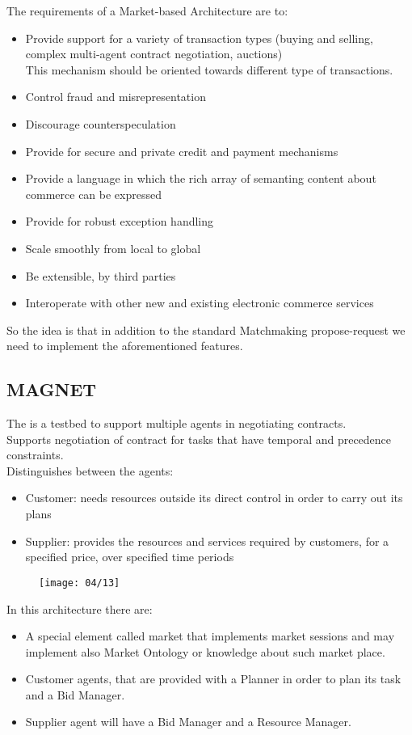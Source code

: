 The requirements of a Market-based Architecture are to:
\begin{itemize}
\item Provide support for a variety of transaction types (buying and selling, complex multi-agent contract negotiation, auctions)\\
This mechanism should be oriented towards different type of transactions.
\item Control fraud and misrepresentation
\item Discourage counterspeculation
\item Provide for secure and private credit and payment mechanisms
\item Provide a language in which the rich array of semanting content about commerce can be expressed
\item Provide for robust exception handling
\item Scale smoothly from local to global
\item Be extensible, by third parties
\item Interoperate with other new and existing electronic commerce services
\end{itemize}
So the idea is that in addition to the standard Matchmaking propose-request we need to implement the aforementioned features.

\subsection{MAGNET}
The   is a testbed to support multiple agents in negotiating contracts.\\
Supports negotiation of contract for tasks that have temporal and precedence constraints.\\
Distinguishes between the agents:
\begin{itemize}
\item Customer: needs resources outside its direct control in order to carry out its plans
\item Supplier: provides the resources and services required by customers, for a specified price, over specified time periods
\end{itemize}

\begin{figure}[!h]
\centering
\texttt{[image: 04/13]}
\end{figure}

In this architecture there are:
\begin{itemize}
\item A special element called market that implements market sessions and may implement also Market Ontology or knowledge about such market place.
\item Customer agents, that are provided with a Planner in order to plan its task and a Bid Manager.
\item Supplier agent will have a Bid Manager and a Resource Manager.
\end{itemize}

